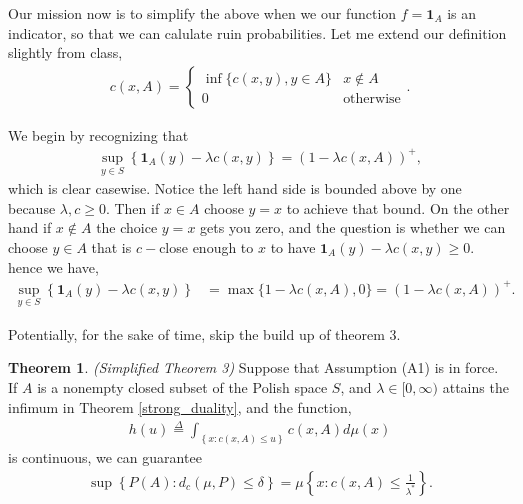 \documentclass[12pt]{article}
\newcommand{\define}{\overset{\Delta}{=}}
\theoremstyle{definition}
\newtheorem{theorem}{Theorem}
\theoremstyle{definition}
\theoremstyle{definition}
\begin{document}
Our mission now is to simplify the above when we our function $f=\bm{1}_{A}$ is an indicator, so that we can calulate ruin probabilities. Let me extend our definition slightly from class,
\begin{align*}
c(x,A) = \begin{cases}
\inf\{c(x,y), y\in A\} & x\not\in A\\
0 & \text{otherwise}
\end{cases}.
\end{align*}


We begin by recognizing that
\begin{align*}
\sup_{y\in S}\left\{\bm{1}_A(y)-\lambda c(x,y)\right\}=\left(1-\lambda c(x,A)\right)^+,
\end{align*}
which is clear casewise. Notice the left hand side is bounded above by one because $\lambda,c\geq 0$. Then if $x\in A$ choose $y=x$ to achieve that bound. On the other hand if $x\not\in A$ the choice $y=x$ gets you zero, and the question is whether we can choose $y\in A$ that is $c-$close enough to $x$ to have $\bm{1}_A(y)-\lambda c(x,y)\geq 0$. hence we have,
\begin{align*}
\sup_{y\in S}\left\{\bm{1}_A(y)-\lambda c(x,y)\right\}&=\max\{1-\lambda c(x,A), 0\}=\left(1-\lambda c(x,A)\right)^+.
\end{align*}

Potentially, for the sake of time, skip the build up of theorem 3. 
\begin{theorem}\label{simplified_3} \emph{(Simplified Theorem 3)} Suppose that Assumption (A1) is in force. If $A$ is a nonempty closed subset of the Polish space $S$, and $\lambda\in[0,\infty)$ attains the infimum in Theorem \ref{strong_duality}, and the function,
\begin{align*}
h(u)\define\int_{\left\{x: c(x,A)\leq u\right\}}^{}c(x,A)d\mu(x)
\end{align*}
is continuous, we can guarantee
\begin{align*}
\sup\left\{P(A): d_c(\mu,P)\leq \delta\right\}=\mu\left\{ x: c(x,A)\leq \frac{1}{\lambda^*}\right\}.
\end{align*}
\end{theorem}

\clearpage
\end{document}
